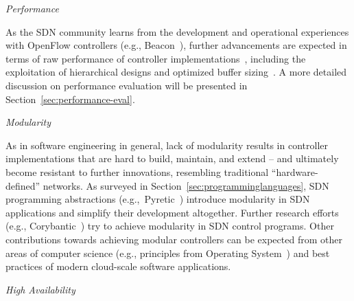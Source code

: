 %

\vspace{2mm}
\noindent \textit{Performance}

As the SDN community learns from the development and operational experiences with OpenFlow controllers (e.g., Beacon~\cite{erickson2013-1}), further advancements are expected in terms of raw performance of controller implementations~\cite{azodolmolky2013-2}, including the exploitation of hierarchical designs and optimized buffer sizing~\cite{azodolmolky2013-2}. A more detailed discussion on performance evaluation will be presented in Section~\ref{sec:performance-eval}. 


\vspace{2mm}
\noindent \textit{Modularity}

As in software engineering in general, lack of modularity results in controller 
implementations that are hard to build, maintain, and extend -- and ultimately become resistant to further 
innovations, resembling traditional ``hardware-defined'' networks. As surveyed in Section~\ref{sec:programminglanguages}, 
SDN programming abstractions (e.g.,~Pyretic~\cite{monsanto2013}) introduce modularity in SDN 
applications and simplify their development altogether. Further research efforts (e.g., 
Corybantic~\cite{auyoung2013}) try to achieve modularity in SDN control programs. Other 
contributions towards achieving modular controllers can be expected from other areas of computer science 
(e.g., principles from Operating System~\cite{monaco2013}) and best practices of modern 
cloud-scale software applications.

\vspace{2mm}
\noindent \textit{High Availability}

